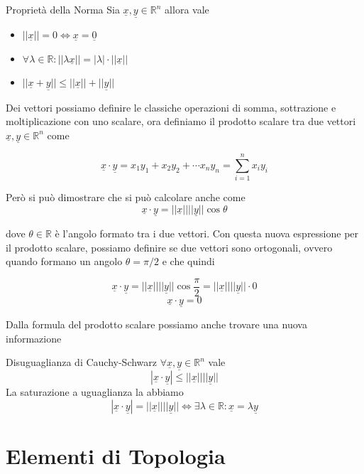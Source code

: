 \documentclass{rapport}
\begin{document}
\begin{teorema}{Proprietà della Norma}{}
  Sia $\underline{x}, \underline{y} \in\mathbb{R}^n$ allora vale 

  
  \begin{itemize}
    \centering
    \item $ ||\underline{x} || = 0 \iff \underline{x} = \underline{0}$
    \item $\forall \lambda \in\mathbb{R}: ||\lambda\underline{x} || = |\lambda|\cdot||\underline{x} ||$
    \item $||\underline{x} + \underline{y} || \leq ||\underline{x}|| + ||\underline{y}|| $
  \end{itemize}
\end{teorema}

Dei vettori possiamo definire le classiche operazioni di somma, sottrazione e moltiplicazione con uno scalare, ora definiamo il prodotto scalare tra due vettori $\underline{x}, \underline{y} \in \mathbb{R}^n$ come 

\[
\underline{x} \cdot \underline{y} = x_1y_1 + x_2y_2 + \cdots x_ny_n = \sum_{i=1}^{n} x_iy_i 
\]

Però si può dimostrare che si può calcolare anche come 
\[
\underline{x} \cdot \underline{y} = ||\underline{x}||||\underline{y}|| \cos\theta
\]

dove $\theta\in\mathbb{R}$ è l'angolo formato tra i due vettori. Con questa nuova espressione per il prodotto scalare, possiamo definire se due vettori sono ortogonali, ovvero quando formano un angolo $\theta=\pi/2$ e che quindi 

\[
\underline{x} \cdot \underline{y} = ||\underline{x}||||\underline{y}|| \cos\dfrac{\pi}{2} = ||\underline{x}||||\underline{y}||  \cdot 0
\]
\[
\underline{x} \cdot \underline{y} = 0
\]



Dalla formula del prodotto scalare possiamo anche trovare una nuova informazione 

\begin{teorema}{Disuguaglianza di Cauchy-Schwarz}{}
  $\forall \underline{x}, \underline{y} \in \mathbb{R}^n$ vale
  \[
  |\underline{x} \cdot \underline{y} | \leq ||\underline{x}|| ||\underline{y}||
  \]
  La saturazione a uguaglianza la abbiamo  
  \[
  |\underline{x} \cdot \underline{y} | = ||\underline{x}|| ||\underline{y}|| \iff \exists \lambda \in\mathbb{R}: \underline{x} = \lambda \underline{y}
  \]
\end{teorema}
\newpage

\section{Elementi di Topologia}
\end{document}
